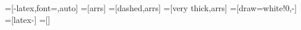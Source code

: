 
=[-latex,font=\small,auto]
=[arrs]
=[dashed,arrs]
=[very thick,arrs]
=[draw=white!0,-]
=[latex-]
=[]